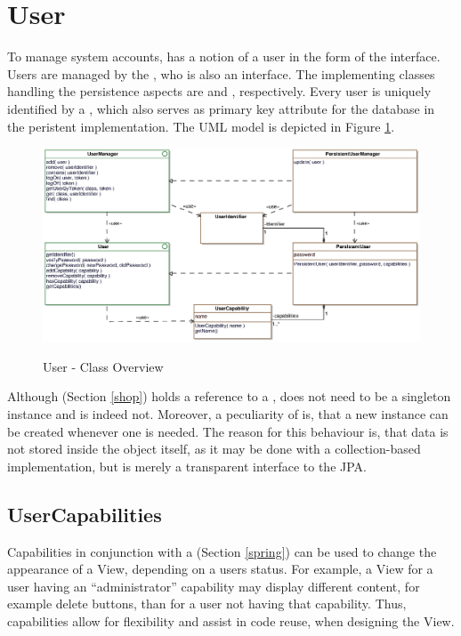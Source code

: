 \section{User}
\label{sec:user}
To manage system accounts, \salespoint{} has a notion of a user in the form of the  interface.
Users are managed by the , who is also an interface.
The implementing classes handling the persistence aspects are  and , respectively.
Every user is uniquely identified by a , which also serves as primary key attribute for the database in the peristent implementation.
The UML model is depicted in Figure \ref{user_overview}.\\

\begin{figure}
	\centering
  \includegraphics[width=1.0\textwidth]{images/User_Overview.eps}
	\label{user_overview}
	\caption{User - Class Overview}
\end{figure}

Although  (Section \ref{shop}) holds a reference to a ,  does not need to be a singleton instance and is indeed not.
Moreover, a peculiarity of  is, that a new instance can be created whenever one is needed.
The reason for this behaviour is, that data is not stored inside the  object itself, as it may be done with a collection-based implementation, but  is merely a transparent interface to the JPA.\\

\subsection*{UserCapabilities}
Capabilities in conjunction with a  (Section \ref{spring}) can be used to change the appearance of a View, depending on a users status.
For example, a View for a user having an ``administrator'' capability may display different content, for example delete buttons, than for a user not having that capability.
Thus, capabilities allow for flexibility and assist in code reuse, when designing the View.

